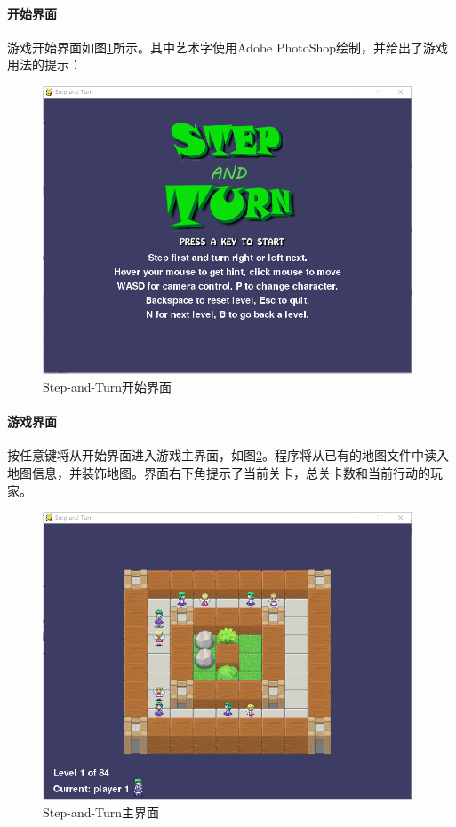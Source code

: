 \paragraph{开始界面}
游戏开始界面如图\ref{fig:startscreen}所示。其中艺术字使用{\ttfamily Adobe PhotoShop}绘制，并给出了游戏用法的提示：
\begin{figure}[htbp]
\centering
\includegraphics[width=11cm]{pic/startscreen.png}
\caption{Step-and-Turn开始界面}
\label{fig:startscreen}
\end{figure}

\paragraph{游戏界面}
按任意键将从开始界面进入游戏主界面，如图\ref{fig:ui}。程序将从已有的地图文件中读入地图信息，并装饰地图。界面右下角提示了当前关卡，总关卡数和当前行动的玩家。
\begin{figure}[htbp]
\centering
\includegraphics[width=11cm]{pic/ui.png}
\caption{Step-and-Turn主界面}
\label{fig:ui}
\end{figure}

